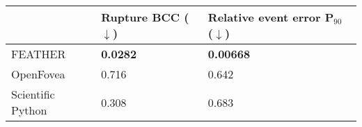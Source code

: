\begin{tabularx}{\textwidth}{ l | l | l  }
 & Rupture BCC ($\downarrow$) & Relative event error P$_{90}$ ($\downarrow$)\\ \hline \hline 
FEATHER & \textbf{0.0282} & \textbf{0.00668}\\ \hline
OpenFovea & 0.716 & 0.642\\ \hline
Scientific Python & 0.308 & 0.683\\ \hline

\end{tabularx}
